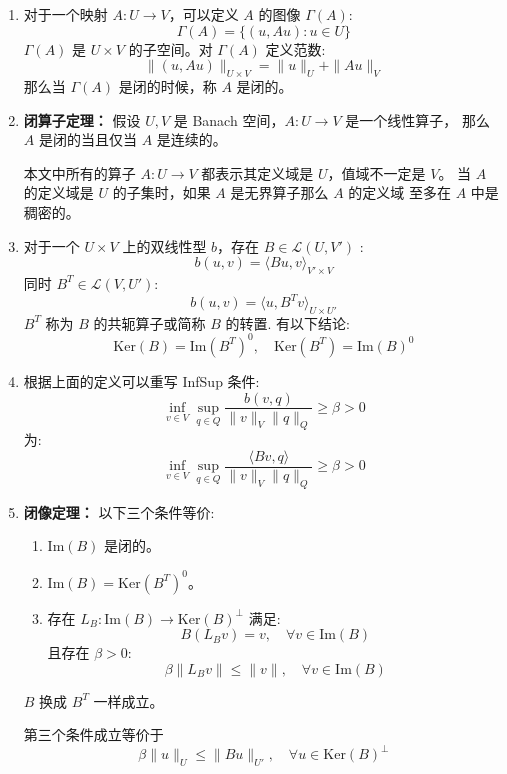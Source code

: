 \documentclass[lang=cn,a4paper,newtx]{elegantpaper}
\begin{document}
\begin{enumerate}
\item 对于一个映射 $A: U \to V$，可以定义 $A$ 的图像 $\Gamma(A)$:
        $$
        \Gamma(A) = \{(u, Au): u\in U\}
        $$
        $\Gamma(A)$ 是 $U\times V$ 的子空间。对 $\Gamma(A)$ 定义范数:
        $$
        \|(u, Au)\|_{U\times V} = \|u\|_U + \|Au\|_V
        $$
        那么当 $\Gamma(A)$ 是闭的时候，称 $A$ 是闭的。

\item \textbf{闭算子定理：} 假设 $U, V$ 是 Banach 空间，$A: U \to V$ 是一个线性算子，
    那么 $A$ 是闭的当且仅当 $A$ 是连续的。
    \begin{note}
        本文中所有的算子 $A : U\to V$ 都表示其定义域是 $U$，值域不一定是 $V$。
        当 $A$ 的定义域是 $U$ 的子集时，如果 $A$ 是无界算子那么 $A$ 的定义域
        至多在 $A$ 中是稠密的。
    \end{note}
    

\item 对于一个 $U\times V$ 上的双线性型 $b$，存在 $B \in \mathcal{L}(U, V')$ :
    $$
    b(u, v) = \langle Bu,  v\rangle_{V'\times V}
    $$
    同时 $B^T\in \mathcal{L}(V, U')$:
    $$
    b(u, v) = \langle u,  B^Tv\rangle_{U\times U'}
    $$
    $B^T$ 称为 $B$ 的共轭算子或简称 $B$ 的转置. 有以下结论:
    $$
    \mathrm{Ker}(B) = \mathrm{Im}(B^T)^0, \quad 
    \mathrm{Ker}(B^T) = \mathrm{Im}(B)^0
    $$

\item 根据上面的定义可以重写 InfSup 条件:
    $$
    \inf_{v\in V}\sup_{q\in Q}\frac{b(v, q)}{\|v\|_V\|q\|_Q} \geq \beta > 0
    $$
    为:
    $$
    \inf_{v\in V}\sup_{q\in Q}\frac{\langle Bv,  q\rangle}{\|v\|_V\|q\|_Q} \geq
    \beta > 0
    $$

\item \textbf{闭像定理：} 以下三个条件等价:
    \begin{enumerate}
        \item $\mathrm{Im}(B)$ 是闭的。
        \item $\mathrm{Im}(B) = \mathrm{Ker}(B^T)^0$。
        \item 存在 $L_B : \mathrm{Im}(B) \to \mathrm{Ker}(B)^{\perp}$ 满足: 
            $$
            B(L_Bv) = v, \quad \forall v \in \mathrm{Im}(B)
            $$
            且存在 $\beta > 0$:
            $$
            \beta\|L_Bv\| \leq \|v\|, \quad \forall v \in \mathrm{Im}(B) 
            $$
    \end{enumerate} 
    $B$ 换成 $B^T$ 一样成立。
    \begin{note}
        第三个条件成立等价于 
        $$
        \beta\|u\|_{U} \leq \|Bu\|_{U'}, \quad \forall u \in \mathrm{Ker}(B)^{\perp}
        $$
    \end{note}



\end{enumerate}
\end{document}
